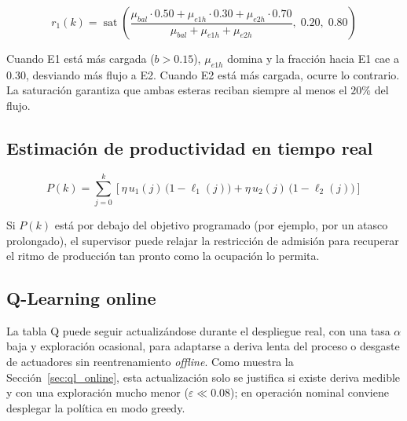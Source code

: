 \[
r_1(k) = \operatorname{sat}\!\left(\frac{\mu_{bal} \cdot 0.50 + \mu_{e1h} \cdot 0.30 + \mu_{e2h} \cdot 0.70}{\mu_{bal} + \mu_{e1h} + \mu_{e2h}},\;0.20,\;0.80\right)
\]

Cuando E1 está más cargada ($b>0.15$), $\mu_{e1h}$ domina y la fracción hacia E1 cae a $0.30$, desviando más flujo a E2. Cuando E2 está más cargada, ocurre lo contrario. La saturación garantiza que ambas esteras reciban siempre al menos el $20\%$ del flujo.

\subsection*{Estimación de productividad en tiempo real}

\[
P(k) = \sum_{j=0}^{k}\!\left[\eta\,u_1(j)\,\bigl(1-\ell_1(j)\bigr) + \eta\,u_2(j)\,\bigl(1-\ell_2(j)\bigr)\right]
\]

Si $P(k)$ está por debajo del objetivo programado (por ejemplo, por un atasco prolongado), el supervisor puede relajar la restricción de admisión para recuperar el ritmo de producción tan pronto como la ocupación lo permita.

\subsection*{Q-Learning online}

La tabla Q puede seguir actualizándose durante el despliegue real, con una tasa $\alpha$ baja y exploración ocasional, para adaptarse a deriva lenta del proceso o desgaste de actuadores sin reentrenamiento \emph{offline}. Como muestra la Sección~\ref{sec:ql_online}, esta actualización solo se justifica si existe deriva medible y con una exploración mucho menor ($\varepsilon \ll 0.08$); en operación nominal conviene desplegar la política en modo greedy.
